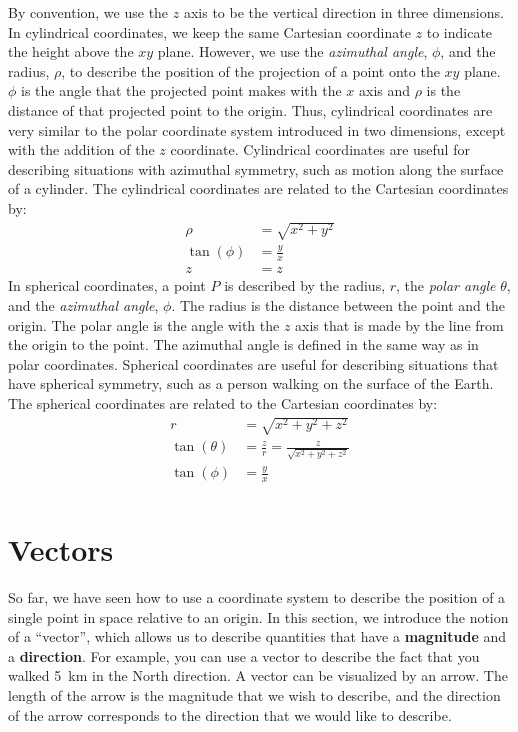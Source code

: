 By convention, we use the $z$ axis to be the vertical direction in three dimensions. In cylindrical coordinates, we keep the same Cartesian coordinate $z$ to indicate the height above the $xy$ plane. However, we use the \textit{azimuthal angle}, $\phi$, and the radius, $\rho$, to describe the position of the projection of a point onto the $xy$ plane. $\phi$ is the angle that the projected point makes with the $x$ axis and $\rho$ is the distance of that projected point to the origin. Thus, cylindrical coordinates are very similar to the polar coordinate system introduced in two dimensions, except with the addition of the $z$ coordinate. Cylindrical coordinates are useful for describing situations with azimuthal symmetry, such as motion along the surface of a cylinder. The cylindrical coordinates are related to the Cartesian coordinates by:
\begin{align*}
\rho &= \sqrt{x^2+y^2}\\
\tan(\phi) &= \frac{y}{x}\\
z&=z
\end{align*}
In spherical coordinates, a point $P$ is described by the radius, $r$, the \textit{polar angle} $\theta$, and the \textit{azimuthal angle}, $\phi$. The radius is the distance between the point and the origin. The polar angle is the angle with the $z$ axis that is made by the line from the origin to the point. The azimuthal angle is defined in the same way as in polar coordinates. Spherical coordinates are useful for describing situations that have spherical symmetry, such as a person walking on the surface of the Earth. The spherical coordinates are related to the Cartesian coordinates by:
\begin{align*}
r &= \sqrt{x^2+y^2+z^2}\\
\tan(\theta) &= \frac{z}{r}=\frac{z}{\sqrt{x^2+y^2+z^2}}\\
\tan(\phi) &= \frac{y}{x}\\
\end{align*}

\section{Vectors}
So far, we have seen how to use a coordinate system to describe the position of a single point in space relative to an origin. In this section, we introduce the notion of a ``vector'', which allows us to describe quantities that have a \textbf{magnitude} and a \textbf{direction}. For example, you can use a vector to describe the fact that you walked \SI{5}{km} in the North direction. A vector can be visualized by an arrow. The length of the arrow is the magnitude that we wish to describe, and the direction of the arrow corresponds to the direction that we would like to describe. 

